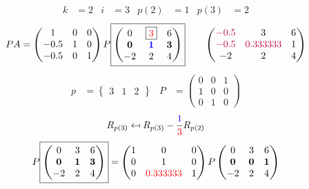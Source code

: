 \documentclass[pdf]{beamer}
\begin{document}
\begin{frame}{}\begin{align*} k &= 2 & i &= 3 & p(2) &= 1 & p(3) &= 2\end{align*} $$PA=\begin{pmatrix}1&0&0\\-0.5&1&0\\-0.5&0&1\end{pmatrix} P \boxed{\begin{pmatrix}0&\boxed{{\color{red}3}}&6\\\mathbf{0}&\mathbf{{\color{blue}1}}&\mathbf{3}\\-2&2&4\end{pmatrix}} \quad\quad \begin{pmatrix}{\color{purple}-0.5}&3&6\\{\color{purple}-0.5}&{\color{purple}0.333333}&1\\-2&2&4\end{pmatrix}$$ \begin{align*} p&= \begin{Bmatrix}3&1&2\end{Bmatrix} & P&= \begin{pmatrix}0&0&1\\1&0&0\\0&1&0\end{pmatrix} \end{align*} $$R_{p(3)} \mapsfrom R_{p(3)} - \frac{{\color{blue}1}}{{\color{red}3}} R_{p(2)}$$ $$ P \boxed{\begin{pmatrix}0&3&6\\\mathbf{0}&\mathbf{1}&\mathbf{3}\\-2&2&4\end{pmatrix}} = \begin{pmatrix}1&0&0\\0&1&0\\0&{\color{red}0.333333}&1\end{pmatrix} P \begin{pmatrix}0&3&6\\\mathbf{0}&\mathbf{0}&\mathbf{1}\\-2&2&4\end{pmatrix} $$\end{frame}
\end{document}
